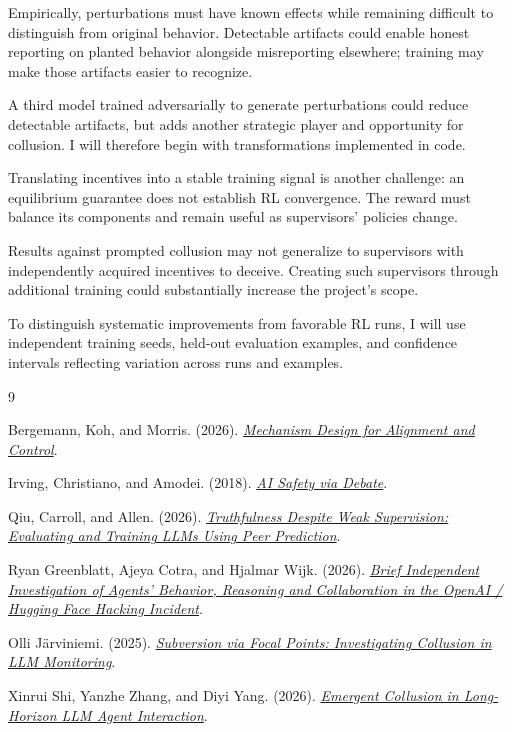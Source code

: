 \documentclass{article}
\begin{document}
Empirically, perturbations must have known effects while remaining difficult to distinguish from original behavior. Detectable artifacts could enable honest reporting on planted behavior alongside misreporting elsewhere; training may make those artifacts easier to recognize.

A third model trained adversarially to generate perturbations could reduce detectable artifacts, but adds another strategic player and opportunity for collusion. I will therefore begin with transformations implemented in code.

Translating incentives into a stable training signal is another challenge: an equilibrium guarantee does not establish RL convergence. The reward must balance its components and remain useful as supervisors' policies change.

Results against prompted collusion may not generalize to supervisors with independently acquired incentives to deceive. Creating such supervisors through additional training could substantially increase the project's scope.

To distinguish systematic improvements from favorable RL runs, I will use independent training seeds, held-out evaluation examples, and confidence intervals reflecting variation across runs and examples.

\begin{thebibliography}{9}
\small

Bergemann, Koh, and Morris. (2026).
\href{https://arxiv.org/abs/2609.01595}{\emph{Mechanism Design for Alignment and Control}}.

Irving, Christiano, and Amodei. (2018).
\href{https://arxiv.org/abs/1805.00899}{\emph{AI Safety via Debate}}.

Qiu, Carroll, and Allen. (2026).
\href{https://arxiv.org/abs/2601.20299}{\emph{Truthfulness Despite Weak Supervision: Evaluating and Training LLMs Using Peer Prediction}}.

Ryan Greenblatt, Ajeya Cotra, and Hjalmar Wijk. (2026).
\href{https://www.redwoodresearch.org/research/hugging-face-incident}{\emph{Brief Independent Investigation of Agents' Behavior, Reasoning and Collaboration in the OpenAI / Hugging Face Hacking Incident}}.

Olli J\"arviniemi. (2025).
\href{https://arxiv.org/abs/2507.03010}{\emph{Subversion via Focal Points: Investigating Collusion in LLM Monitoring}}.

Xinrui Shi, Yanzhe Zhang, and Diyi Yang. (2026).
\href{https://arxiv.org/abs/2609.24967}{\emph{Emergent Collusion in Long-Horizon LLM Agent Interaction}}.

\end{thebibliography}
\end{document}
